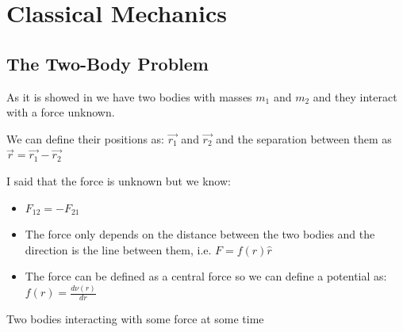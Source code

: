 \setchapterpreamble[u]{\margintoc}
\chapter{Classical Mechanics}

\section{The Two-Body Problem}

As it is showed in  we have two bodies with masses $m_1$ and $m_2$ and they interact with a force unknown.

We can define their positions as: $\vec{r_1}$ and $\vec{r_2}$ and the separation between them as $ \vec{r} =\vec{r_1} - \vec{r_2} $

I said that the force is unknown but we know:

\begin{itemize}
    \item $F_{12} = - F_{21}$
    \item The force only depends on the distance between the two bodies and the direction is the line between them, i.e. $F = f(r)\hat{r}$  
    \item The force can be defined as a central force so we can define a potential as: $f(r)=\frac{d\nu(r)}{dr}$
\end{itemize}


\begin{marginfigure}[-3cm]
\caption[Two bodies interacting with some force]{Two bodies interacting with some force at some time}
\end{marginfigure}


